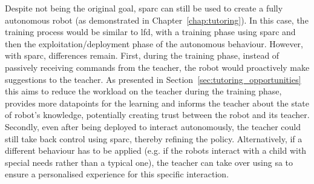 Despite not being the original goal, \gls{sparc} can still be used to create a fully autonomous robot (as demonstrated in Chapter~\ref{chap:tutoring}). In this case, the training process would be similar to \gls{lfd}, with a training phase using \gls{sparc} and then the exploitation/deployment phase of the autonomous behaviour. However, with \gls{sparc}, differences remain. First, during the training phase, instead of passively receiving commands from the teacher, the robot would proactively make suggestions to the teacher. As presented in Section~\ref{sec:tutoring_opportunities} this aims to reduce the workload on the teacher during the training phase, provides more datapoints for the learning and informs the teacher about the state of robot's knowledge, potentially creating trust between the robot and its teacher. Secondly, even after being deployed to interact autonomously, the teacher could still take back control using \gls{sparc}, thereby refining the policy. Alternatively, if a different behaviour has to be applied (e.g. if the robots interact with a child with special needs rather than a typical one), the teacher can take over using \gls{sa} to ensure a personalised experience for this specific interaction.

